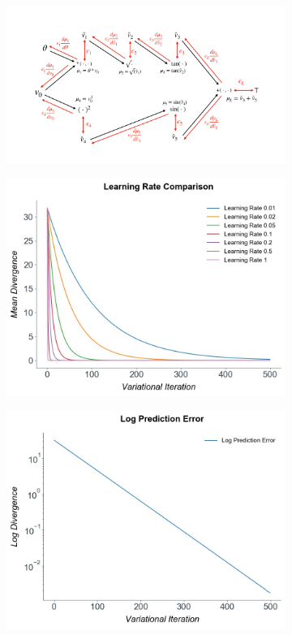  \begin{figure}
\begin{subfigure}{\linewidth}
\centering
\includegraphics[scale=0.15]{chapter_6_figures/pc_schematic.pdf}
\end{subfigure}
\begin{subfigure}{.5\linewidth}
\centering
\includegraphics[scale=0.25]{chapter_6_figures/numerics_proper_learning_rate_comparison.jpg}
\end{subfigure}%
\begin{subfigure}{.5\linewidth}
\centering
\includegraphics[scale=0.25]{chapter_6_figures/numerics_proper_log_divergence.jpg}

\end{subfigure}
\end{figure}
